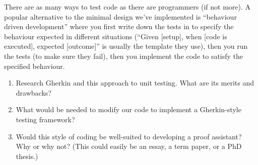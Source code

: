 \begin{xca}
There are as many ways to test code as there are programmers (if not more).
A popular alternative to the minimal design we've implemented is
``behaviour driven development'' where you first write down the tests
in  to specify the behaviour expected in different
situations (``Given [setup], when [code is executed], expected
[outcome]'' is usually the template they use), then you run the tests
(to make sure they fail), then you implement the code to satisfy the
specified behaviour.
\begin{enumerate}
\item Research Gherkin and this approach to unit testing. What are its
  merits and drawbacks?
\item What would be needed to modify our code to implement a
  Gherkin-style testing framework?
\item Would this style of coding be well-suited to developing a proof
  assistant? Why or why not? (This could easily be an essay, a term
  paper, or a PhD thesis.)
\end{enumerate}
\end{xca}
\nwenddocs{}

